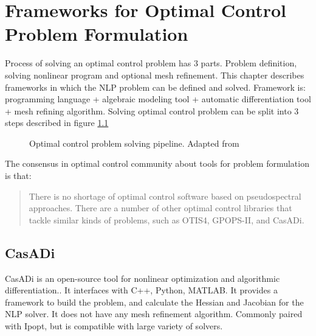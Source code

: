 \chapter{Frameworks for Optimal Control Problem Formulation}
Process of solving an optimal control problem has 3 parts. Problem definition,
solving nonlinear program and optional mesh refinement. This chapter describes frameworks in which the NLP problem can be defined and solved. Framework is: programming language + algebraic modeling tool + automatic differentiation tool + mesh refining algorithm. Solving optimal control problem can be split into 3 steps described in figure \ref{fig:ocp-pipeline}

\begin{figure}[h]
  \centering
  \caption{Optimal control problem solving pipeline. Adapted from \cite[p. 91]{betts}}
  \label{fig:ocp-pipeline}
\end{figure}

The consensus in optimal control community about tools for problem formulation
is that:
\begin{quote}
  There is no shortage of optimal control software based on pseudospectral approaches. There are a number of other optimal control libraries that tackle similar kinds of problems, such as OTIS4, GPOPS-II, and CasADi. \cite{Falck2021,dymos2024}
\end{quote}


\section{CasADi}
CasADi is an open-source tool for nonlinear optimization and algorithmic
differentiation.\cite{CasADi}\cite{Andersson2019}.
It interfaces with C++, Python, MATLAB. It provides a framework to build
the problem, and calculate the Hessian and Jacobian for the NLP solver. It does not
have any mesh refinement algorithm. Commonly paired with Ipopt, but is compatible with large variety of solvers.

